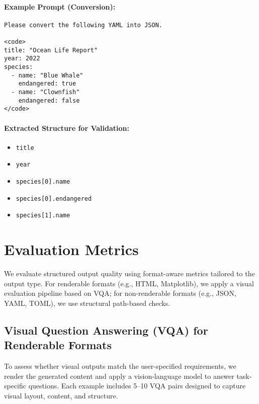 \paragraph{Example Prompt (Conversion):}
\begin{lstlisting}[breaklines=true, basicstyle=\ttfamily\small]
Please convert the following YAML into JSON.

<code>
title: "Ocean Life Report"
year: 2022
species:
  - name: "Blue Whale"
    endangered: true
  - name: "Clownfish"
    endangered: false
</code>
\end{lstlisting}

\paragraph{Extracted Structure for Validation:}
\begin{itemize}
    \item \texttt{title}
    \item \texttt{year}
    \item \texttt{species[0].name}
    \item \texttt{species[0].endangered}
    \item \texttt{species[1].name}
\end{itemize}


\section{Evaluation Metrics}
\label{sec:evaluation-metrics}

We evaluate structured output quality using format-aware metrics tailored to the output type. For renderable formats (e.g., HTML, Matplotlib), we apply a visual evaluation pipeline based on VQA; for non-renderable formats (e.g., JSON, YAML, TOML), we use structural path-based checks.

\subsection{Visual Question Answering (VQA) for Renderable Formats}

To assess whether visual outputs match the user-specified requirements, we render the generated content and apply a vision-language model to answer task-specific questions. Each example includes 5--10 VQA pairs designed to capture visual layout, content, and structure.

